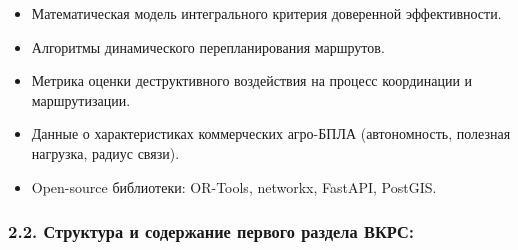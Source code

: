 \begin{itemize}
\tightlist
\item
  Математическая модель интегрального критерия доверенной эффективности.
\item
  Алгоритмы динамического перепланирования маршрутов.
\item
  Метрика оценки деструктивного воздействия на процесс координации и маршрутизации.
\item
  Данные о характеристиках коммерческих агро-БПЛА (автономность, полезная нагрузка, радиус связи).
\item
  Open-source библиотеки: OR-Tools, networkx, FastAPI, PostGIS.
\end{itemize}

\hypertarget{ux441ux442ux440ux443ux43aux442ux443ux440ux430-ux438-ux441ux43eux434ux435ux440ux436ux430ux43dux438ux435-ux43fux435ux440ux432ux43eux433ux43e-ux440ux430ux437ux434ux435ux43bux430-ux432ux43aux440ux441}{%
\subsubsection{2.2. Структура и содержание первого раздела ВКРС:}\label{ux441ux442ux440ux443ux43aux442ux443ux440ux430-ux438-ux441ux43eux434ux435ux440ux436ux430ux43dux438ux435-ux43fux435ux440ux432ux43eux433ux43e-ux440ux430ux437ux434ux435ux43bux430-ux432ux43aux440ux441}}

